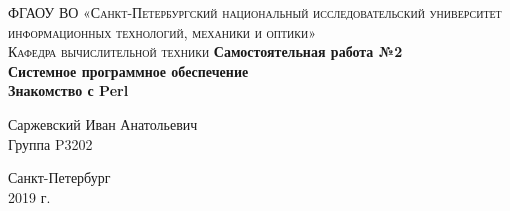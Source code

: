 \begin{titlepage}
\begin{center}

\textsc{ФГАОУ ВО «Санкт-Петербургский национальный исследовательский университет информационных технологий, механики и оптики»\\[4mm]
Кафедра вычислительной техники}
\vfill
\textbf{Самостоятельная работа №2\\[4mm]
Системное программное обеспечение\\[4mm]
Знакомство с Perl\\[16mm]
}
\begin{flushright}
Саржевский Иван Анатольевич
\\[2mm]Группа P3202
\end{flushright}
\vfill
Санкт-Петербург\\[2mm]
2019 г.

\end{center}
\end{titlepage}
